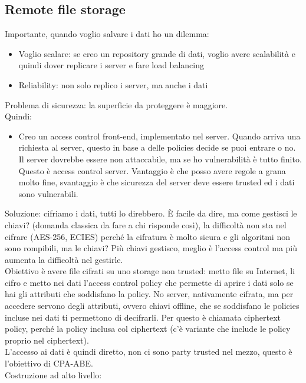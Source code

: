 \documentclass[16px]{article}
\begin{document}
\subsection{Remote file storage}
Importante, quando voglio salvare i dati ho un dilemma:
\begin{itemize}
\item Voglio scalare: se creo un repository grande di dati, voglio avere scalabilità e quindi dover replicare i server e fare load balancing
\item Reliability: non solo replico i server, ma anche i dati
\end{itemize}
Problema di sicurezza: la superficie da proteggere è maggiore.\\ Quindi:
\begin{itemize}
\item Creo un access control front-end, implementato nel server. Quando arriva una richiesta al server, questo in base a delle policies decide se puoi entrare o no.\\ Il server dovrebbe essere non attaccabile, ma se ho vulnerabilità è tutto finito. Questo è access control server. Vantaggio è che posso avere regole a grana molto fine, svantaggio è che sicurezza del server deve essere trusted ed i dati sono vulnerabili.
\end{itemize}
Soluzione: cifriamo i dati, tutti lo direbbero. È facile da dire, ma come gestisci le chiavi? (domanda classica da fare a chi risponde così), la difficoltà non sta nel cifrare (AES-256, ECIES) perché la cifratura è molto sicura e gli algoritmi non sono rompibili, ma le chiavi? Più chiavi gestisco, meglio è l'access control ma più aumenta la difficoltà nel gestirle.\\ Obiettivo è avere file cifrati su uno storage non trusted: metto file su Internet, li cifro e metto nei dati l'access control policy che permette di aprire i dati solo se hai gli attributi che soddisfano la policy. No server, nativamente cifrata, ma per accedere servono degli attributi, ovvero chiavi offline, che se soddisfano le policies incluse nei dati ti permettono di decifrarli. Per questo è chiamata ciphertext policy, perché la policy  inclusa col ciphertext (c'è variante che include le policy proprio nel ciphertext).\\ L'accesso ai dati è quindi diretto, non ci sono party trusted nel mezzo, questo è l'obiettivo di CPA-ABE.\\ Costruzione ad alto livello:
\end{document}
